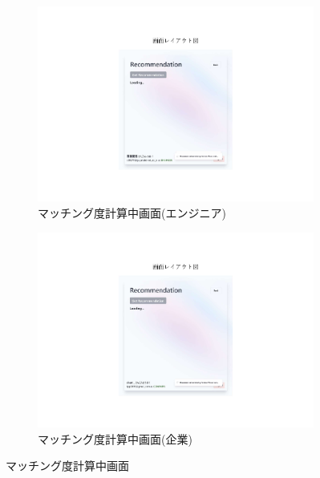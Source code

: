 \documentclass[10pt]{ltjsarticle}
\begin{document}
\begin{figure}[H]
    \centering
    \begin{subfigure}{0.49\textwidth}
        \centering
        \includegraphics[trim=9cm 3.4cm 9cm 4.6cm, clip, width=\linewidth]{./img/recommend_engineer2.pdf}
        \caption{マッチング度計算中画面(エンジニア)}
        \label{fig:recommend_engineer2}
    \end{subfigure}
    \hfill
    \begin{subfigure}{0.49\textwidth}
        \centering
        \includegraphics[trim=9cm 3.4cm 9cm 4.6cm, clip, width=\linewidth]{./img/recommend_company2.pdf}
        \caption{マッチング度計算中画面(企業)}
        \label{fig:recommend_company2}
    \end{subfigure}
    \caption{マッチング度計算中画面}
\end{figure}
\vspace{-.5cm}
\end{document}
